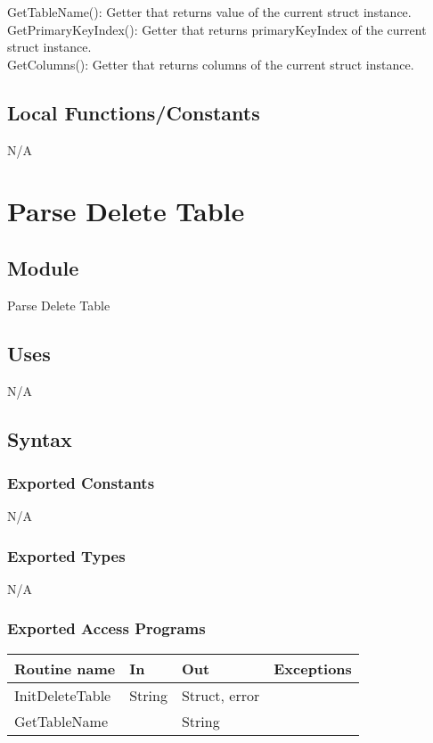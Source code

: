 \documentclass[12pt]{article}
\begin{document}
\noindent GetTableName(): Getter that returns value of the current struct instance. \\

\noindent GetPrimaryKeyIndex(): Getter that returns primaryKeyIndex of the current struct instance.\\

\noindent GetColumns(): Getter that returns columns of the current struct instance.\\


\subsection{Local Functions/Constants}
N/A

\newpage

\section{Parse Delete Table}

\subsection{Module}
Parse Delete Table

\subsection{Uses}
N/A

\subsection{Syntax}
\subsubsection{Exported Constants}
N/A
\subsubsection{Exported Types}
N/A
\subsubsection{Exported Access Programs}
\begin{tabular}{| l | l | l | l |}
\hline
\textbf{Routine name} & \textbf{In} & \textbf{Out} & \textbf{Exceptions}\\
\hline
InitDeleteTable   & String     &  Struct, error         &          \\
\hline
GetTableName & & String & \\
\hline
\end{tabular}
\end{document}
